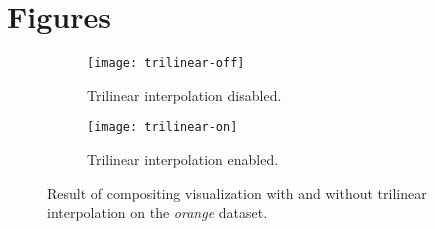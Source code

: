 \documentclass[a4paper]{article}
\begin{document}



\appendix
\section{Figures}

\begin{figure}[h]
  \centering
  \begin{subfigure}[b]{0.45\textwidth}
    \centering
    \texttt{[image: trilinear-off]}
    \caption{Trilinear interpolation disabled.}
  \end{subfigure}
  \hfill
  \begin{subfigure}[b]{0.45\textwidth}
    \centering
    \texttt{[image: trilinear-on]}
    \caption{Trilinear interpolation enabled.}
  \end{subfigure}
  \caption{Result of compositing visualization with and without trilinear interpolation on the \textit{orange} dataset.}
  \label{fig:trilinear}
\end{figure}
\end{document}
